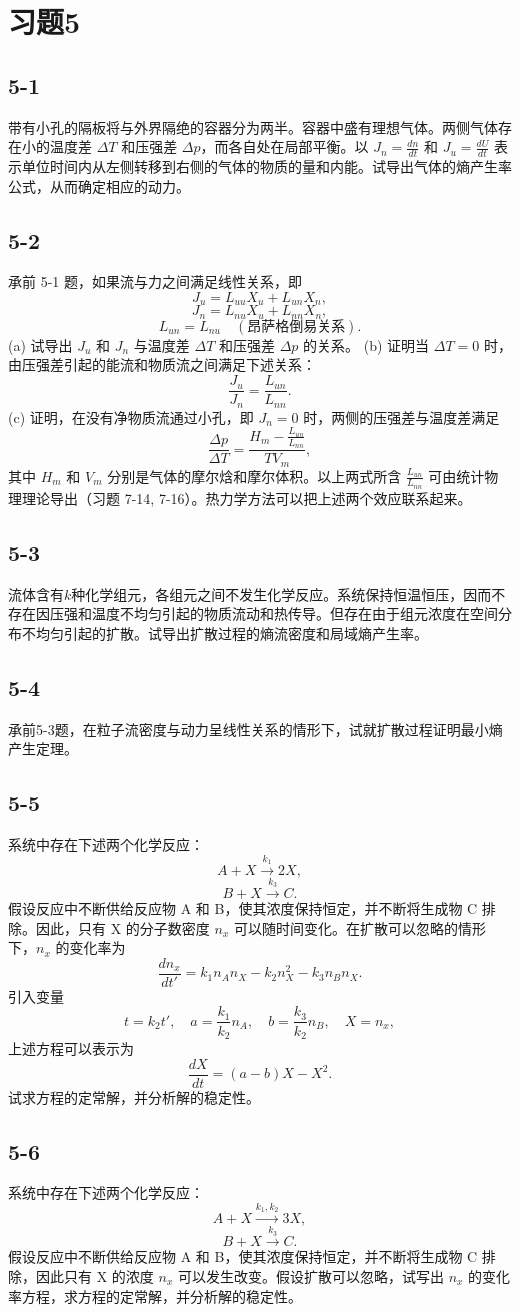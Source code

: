 \section{习题5}


\newpage
\subsection{5-1}
带有小孔的隔板将与外界隔绝的容器分为两半。容器中盛有理想气体。两侧气体存在小的温度差 $\Delta T$ 和压强差 $\Delta p$，而各自处在局部平衡。以 $J_n = \frac{dn}{dt}$ 和 $J_u = \frac{dU}{dt}$ 表示单位时间内从左侧转移到右侧的气体的物质的量和内能。试导出气体的熵产生率公式，从而确定相应的动力。

\newpage
\subsection{5-2}
承前 5-1 题，如果流与力之间满足线性关系，即
$$J_u = L_{uu}X_u + L_{un}X_n,$$
$$J_n = L_{nu}X_u + L_{nn}X_n,$$
$$L_{un} = L_{nu} \quad (\text{昂萨格倒易关系}).$$
(a) 试导出 $J_u$ 和 $J_n$ 与温度差 $\Delta T$ 和压强差 $\Delta p$ 的关系。
(b) 证明当 $\Delta T = 0$ 时，由压强差引起的能流和物质流之间满足下述关系：
$$\frac{J_u}{J_n} = \frac{L_{un}}{L_{nn}}.$$
(c) 证明，在没有净物质流通过小孔，即 $J_n = 0$ 时，两侧的压强差与温度差满足
$$\frac{\Delta p}{\Delta T} = \frac{H_m - \frac{L_{un}}{L_{nn}}}{TV_m},$$
其中 $H_m$ 和 $V_m$ 分别是气体的摩尔焓和摩尔体积。以上两式所含 $\frac{L_{un}}{L_{nn}}$ 可由统计物理理论导出（习题 7-14, 7-16）。热力学方法可以把上述两个效应联系起来。

\newpage
\subsection{5-3}
流体含有$k$种化学组元，各组元之间不发生化学反应。系统保持恒温恒压，因而不存在因压强和温度不均匀引起的物质流动和热传导。但存在由于组元浓度在空间分布不均匀引起的扩散。试导出扩散过程的熵流密度和局域熵产生率。

\newpage
\subsection{5-4}
承前5-3题，在粒子流密度与动力呈线性关系的情形下，试就扩散过程证明最小熵产生定理。

\newpage
\subsection{5-5}
系统中存在下述两个化学反应：
$$A+X \xrightarrow{k_1} 2X,$$
$$B+X \xrightarrow{k_3} C.$$
假设反应中不断供给反应物 A 和 B，使其浓度保持恒定，并不断将生成物 C 排除。因此，只有 X 的分子数密度 $n_x$ 可以随时间变化。在扩散可以忽略的情形下，$n_x$ 的变化率为
$$\frac{dn_x}{dt'} = k_1 n_A n_X - k_2 n_X^2 - k_3 n_B n_X.$$
引入变量
$$t = k_2 t',\quad a = \frac{k_1}{k_2} n_A,\quad b = \frac{k_3}{k_2} n_B,\quad X = n_x,$$
上述方程可以表示为
$$\frac{dX}{dt} = (a-b)X - X^2.$$
试求方程的定常解，并分析解的稳定性。

\newpage
\subsection{5-6}
系统中存在下述两个化学反应：
$$A + X \xrightarrow{k_1, k_2} 3X,$$
$$B + X \xrightarrow{k_3} C.$$
假设反应中不断供给反应物 A 和 B，使其浓度保持恒定，并不断将生成物 C 排除，因此只有 X 的浓度 $n_x$ 可以发生改变。假设扩散可以忽略，试写出 $n_x$ 的变化率方程，求方程的定常解，并分析解的稳定性。




